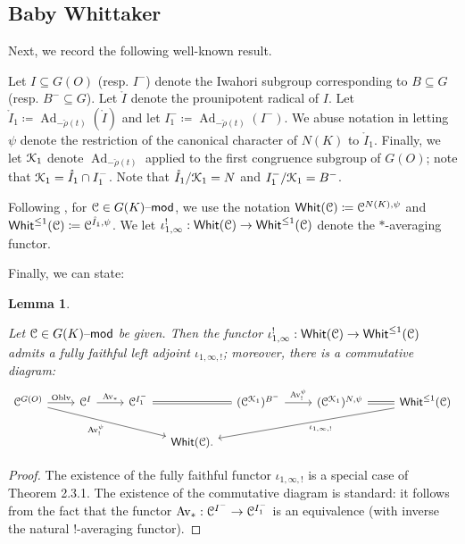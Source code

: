 \documentclass[reqno,11pt]{amsart}
\numberwithin{equation}{subsection}
\newtheorem{lem}[thm]{Lemma}
\theoremstyle{remark}
\newcommand{\sC}{{\EuScript C}}
\newcommand{\sK}{{\EuScript K}}
\newcommand{\on}{\operatorname}
\newcommand{\mathendash}{\text{\textendash}}
\newcommand{\Ad}{\on{Ad}}
\newcommand{\Whit}{\mathsf{Whit}}
\renewcommand{\mod}{\mathendash\mathsf{mod}}
\newcommand{\Oblv}{\on{Oblv}}
\newcommand{\Av}{\on{Av}}
\renewcommand{\o}[1]{\mathring{#1}}
\renewcommand{\subset}{\subseteq}
\begin{document}
\subsection{Baby Whittaker}\label{ss:baby-at}

Next, we record the following well-known result.

Let $I \subset G(O)$ (resp. $I^-$) denote the Iwahori subgroup corresponding to 
$B \subset G$ (resp. $B^- \subset G$). Let $\o{I}$ denote the prounipotent radical
of $I$. Let $\o{I}_1 \coloneqq \Ad_{-\check{\rho}(t)}(\o{I})$ 
and let $I_1^- \coloneqq \Ad_{-\check{\rho}(t)}(I^-)$. We abuse
notation in letting $\psi$ denote the restriction of the canonical character
of $N(K)$ to $\o{I}_1$. Finally, we let $\sK_1$ denote $\Ad_{-\check{\rho}(t)}$
applied to the first congruence subgroup of $G(O)$; note that
$\sK_1 = \o{I}_1 \cap I_1^-$. Note that
$\o{I}_1/\sK_1 = N$ and $I_1^-/\sK_1 = B^-$.

Following \cite{whit}, for $\sC \in G(K)\mod$, we use the notation
$\Whit(\sC) \coloneqq \sC^{N(K),\psi}$ and 
$\Whit^{\leq 1}(\sC) \coloneqq \sC^{\o{I}_1,\psi}$. 
We let $\iota_{1,\infty}^!:\Whit(\sC) \to \Whit^{\leq 1}(\sC)$
denote the $*$-averaging functor.

Finally, we can state:

\begin{lem}\label{l:baby}

Let $\sC \in G(K)\mod$ be given. Then the functor
$\iota_{1,\infty}^!:\Whit(\sC) \to \Whit^{\leq 1}(\sC)$
admits a fully faithful left adjoint $\iota_{1,\infty,!}$; moreover, there is a 
commutative diagram:
%
\[
\begin{tikzcd}[column sep = small]
\sC^{G(O)} 
\arrow[rr,"\Oblv"] 
\arrow[drrrrr,swap,"\Av_!^{\psi}"]
&&
\sC^{I} \arrow[rr,"\Av_*"]
&&
\sC^{I_1^-}
\arrow[rr,equals]
&&
(\sC^{\sK_1})^{B^-}
\arrow[rr,"\Av_!^{\psi}"]
&&
(\sC^{\sK_1})^{N,\psi}
\arrow[rr,equals]
&&
\Whit^{\leq 1}(\sC)
\arrow[dlllll,"\iota_{1,\infty,!}"]
\\
&&&&&\Whit(\sC).
\end{tikzcd}
\]

\end{lem}

\begin{proof}

The existence of the fully faithful functor $\iota_{1,\infty,!}$ is
a special case of \cite{whit} Theorem 2.3.1. 
The existence of the commutative diagram is standard:
it follows from the fact that the functor
$\Av_*:\sC^{I^-} \to \sC^{I_1^-}$ is an equivalence (with inverse
the natural $!$-averaging functor). 

\end{proof}
\end{document}
